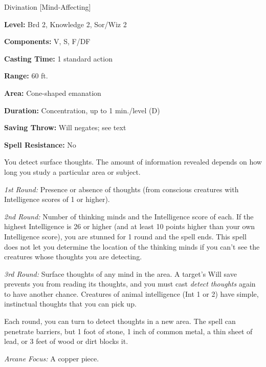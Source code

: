 
Divination [Mind-Affecting]

\textbf{Level:} Brd 2, Knowledge 2, Sor/Wiz 2

\textbf{Components:} V, S, F/DF

\textbf{Casting Time:} 1 standard action

\textbf{Range:} 60 ft.

\textbf{Area:} Cone-shaped emanation

\textbf{Duration:} Concentration, up to 1 min./level (D)

\textbf{Saving Throw:} Will negates; see text

\textbf{Spell Resistance:} No

You detect surface thoughts. The amount of information revealed depends on how 
long you study a particular area or subject.

\textit{1st Round:} Presence or absence of thoughts (from conscious creatures with 
Intelligence scores of 1 or higher).

\textit{2nd Round:} Number of thinking minds and the Intelligence score of each. 
If the highest Intelligence is 26 or higher (and at least 10 points higher than 
your own Intelligence score), you are stunned for 1 round and the spell ends. This 
spell does not let you determine the location of the thinking minds if you can't 
see the creatures whose thoughts you are detecting.

\textit{3rd Round:} Surface thoughts of any mind in the area. A target's Will save 
prevents you from reading its thoughts, and you must cast \textit{detect thoughts 
}again to have another chance. Creatures of animal intelligence (Int 1 or 2) have 
simple, instinctual thoughts that you can pick up.

Each round, you can turn to detect thoughts in a new area. The spell can penetrate 
barriers, but 1 foot of stone, 1 inch of common metal, a thin sheet of lead, or 
3 feet of wood or dirt blocks it.

\textit{Arcane Focus:} A copper piece.

